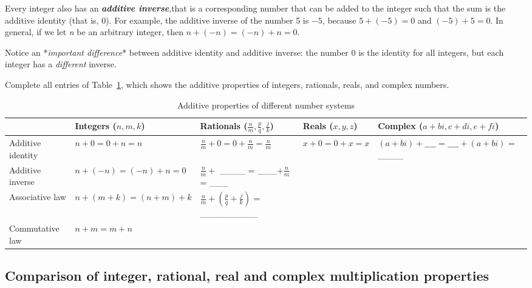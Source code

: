 Every integer also has an \textbf{\emph{additive inverse}},that is a corresponding number that can be added to the integer such
that the sum is the additive identity (that is, 0). For example, the
additive inverse of the number 5 is $-5$, because $5+(-5)=0$ and
$(-5)+5=0$. In general, if we let \emph{n }be an arbitrary integer,
then $n+(-n)=(-n)+n=0$.

Notice an {*}\emph{important difference}{*} between additive
identity and additive inverse: the number 0 is the identity for all
integers, but each integer has a \emph{different} inverse.

\begin{exercise}\label{exercise:complex:tableentries}
Complete all entries of Table~\ref{additive_table}, which shows the additive properties of integers,
rationals, reals, and complex numbers.
\begin{table}[!htb]
\caption{Additive properties of different number systems}\label{additive_table}
\begin{tabular}{|p{2.1cm}|p{2.1cm}|p{2.1cm}|p{2.1cm}|p{3.0cm}|}
\hline 
\rule{0pt}{2.6ex} &Integers ($n,m,k$)  & Rationals ($\frac{n}{m},\frac{p}{q},\frac{j}{k}$)  & Reals ($x,y,z$)  & Complex  {\small($a+bi,c+di,e+fi$)}\rule[-1.2ex]{0pt}{0pt} \tabularnewline
\hline
\hline 
\rule{0pt}{2.6ex} Additive  identity  &  $n+0 = 0+n  =n$   & $\frac{n}{m}+0 = 0+\frac{n}{m}=\frac{n}{m}$  & $x+0= 0+x=x$  & {\small $(a+bi)+\_\_\_\_=  \_\_\_\_+(a+bi)$ = \_\_\_\_} \rule[-1.2ex]{0pt}{0pt} \tabularnewline
\hline 
\rule{0pt}{2.6ex} Additive inverse  & $n+(-n)=(-n)+n=0$  & $\frac{n}{m} + $ \_\_\_\_ = \_\_\_$+\frac{n}{m}$ = \_\_\_  &  & \rule[-1.2ex]{0pt}{0pt} \tabularnewline
\hline 
\rule{0pt}{2.6ex} Associative law\index{Associative property}  & $n+(m+k)=(n+m)+k$  & $\frac{n}{m}+(\frac{p}{q}+\frac{j}{k})$ = \_\_\_\_\_\_\_\_\_  &  & \rule[-1.2ex]{0pt}{0pt} \tabularnewline
\hline 
\rule{0pt}{2.6ex} Commutative law\index{Commutative property}  & $n+m=m+n$  &  &  & \rule[-1.2ex]{0pt}{0pt} \tabularnewline
\hline
\end{tabular}
\end{table}

\end{exercise}

\subsection{Comparison of integer, rational, real and complex
multiplication properties}


